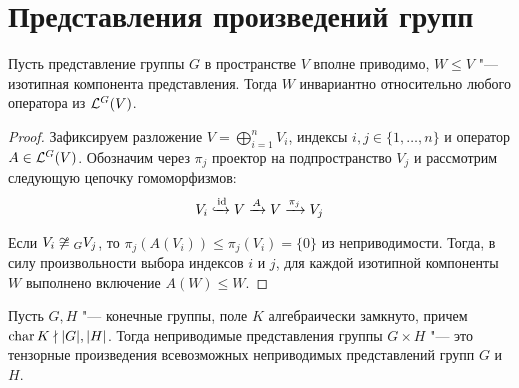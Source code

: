\section{Представления произведений групп}

\begin{proposition}
	Пусть представление группы $G$ в пространстве $V$ вполне приводимо, $W \le V$ "--- изотипная компонента представления. Тогда $W$ инвариантно относительно любого оператора из $\mathcal L^G(V)$.
\end{proposition}

\begin{proof}
	Зафиксируем разложение $V = \bigoplus_{i=1}^n V_i$, индексы $i, j \in \{1, \dotsc, n\}$ и оператор $A \in \mathcal L^G(V)$. Обозначим через $\pi_j$ проектор на подпространство $V_j$ и рассмотрим следующую цепочку гомоморфизмов:
	\[V_i \xhookrightarrow[]{\mathrm{id}} V \xrightarrow{A} V \xrightarrow{\pi_j} V_j\]
	
	Если $V_i \centernot\cong_G V_j$, то $\pi_j(A(V_i)) \le \pi_j(V_i) = \{0\}$ из неприводимости. Тогда, в силу произвольности выбора индексов $i$ и $j$, для каждой изотипной компоненты $W$ выполнено включение $A(W) \le W$.
\end{proof}

\begin{theorem}
	Пусть $G, H$ "--- конечные группы, поле $K$ алгебраически замкнуто, причем $\operatorname{char}{K} \nmid |G|, |H|$. Тогда неприводимые представления группы $G \times H$ "--- это тензорные произведения всевозможных неприводимых представлений групп $G$ и $H$.
\end{theorem}

